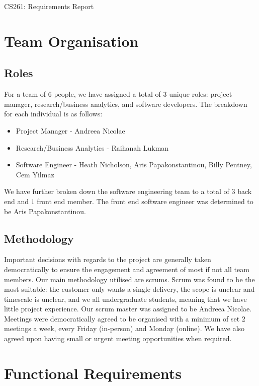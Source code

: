 \documentclass[a4paper]{article}
\theoremstyle{plain}
\theoremstyle{definition}
\theoremstyle{remark}
\begin{document}
\begin{center}
	\hline
	\vspace{0.5cm}
	\Huge
	CS261: Requirements Report
	\vspace{0.4cm}
	\hline
\end{center}
\section{Team Organisation}
\subsection{Roles}
For a team of $6$ people, we have assigned a total of $3$ unique roles: project manager, research/business analytics, and software developers. The breakdown for each individual is as follows:
\begin{itemize}
	\item  Project Manager - Andreea Nicolae
	\item Research/Business Analytics - Raihanah Lukman
	\item Software Engineer - Heath Nicholson, Aris Papakonstantinou, Billy Pentney, Cem Yilmaz
\end{itemize}
We have further broken down the software engineering team to a total of $3$ back end and $1$ front end member. The front end software engineer was determined to be Aris Papakonstantinou.
\subsection{Methodology}
Important decisions with regards to the project are generally taken democratically to ensure the engagement and agreement of most if not all team members. Our main methodology utilised are scrums. Scrum was found to be the most suitable: the customer only wants a single delivery, the scope is unclear and timescale is unclear, and we all undergraduate students, meaning that we have little project experience. Our scrum master was assigned to be Andreea Nicolae. Meetings were democratically agreed to be organised with a minimum of set $2 $ meetings a week, every Friday (in-person) and Monday (online). We have also agreed upon having small or urgent meeting opportunities when required. \\
\hline
\section{Functional Requirements}
\end{document}
